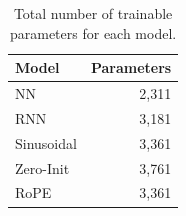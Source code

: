 \begin{table}[!htbp]
\centering
\caption{Total number of trainable parameters for each model.}
\label{tab:param-count}
\begin{tabular}{l r}
\toprule
Model & Parameters \\
\midrule
NN          & 2,311 \\
RNN         & 3,181 \\
\midrule
Sinusoidal  & 3,361 \\
Zero-Init   & 3,761 \\
RoPE        & 3,361 \\
\bottomrule
\end{tabular}
\end{table}
